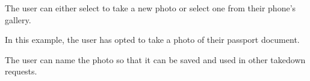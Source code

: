 \begin{minipage}{\textwidth}
  \centering
  \begin{minipage}[t]{4.6cm}
    \vspace{0pt}
    \centering
    \begin{minipage}{4.4cm}
      The user can either select to take a new photo or select one from their phone's gallery.
    \end{minipage}
  \end{minipage}
  \begin{minipage}[t]{4.6cm}
    \vspace{0pt}
    \centering
    \begin{minipage}{4.4cm}
      In this example, the user has opted to take a photo of their passport document.
    \end{minipage}
  \end{minipage}
  \begin{minipage}[t]{4.6cm}
    \vspace{0pt}
    \centering
    \begin{minipage}{4.4cm}
      The user can name the photo so that it can be saved and used in other takedown requests.
    \end{minipage}
  \end{minipage}
\end{minipage}

\clearpage

